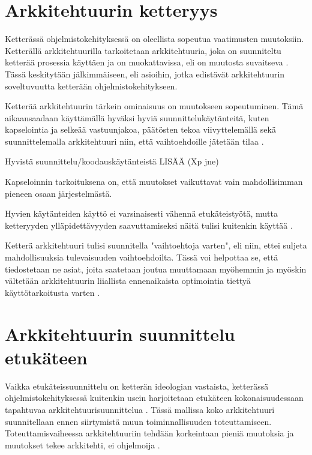 \section{Arkkitehtuurin ketteryys}

Ketterässä ohjelmistokehityksessä on oleellista sopeutua vaatimusten muutoksiin. Ketterällä arkkitehtuurilla tarkoitetaan arkkitehtuuria, joka on suunniteltu ketterää prosessia käyttäen ja on muokattavissa, eli on muutosta suvaitseva \citep{waterman_how_2015}. Tässä keskitytään jälkimmäiseen, eli asioihin, jotka edistävät arkkitehtuurin soveltuvuutta ketterään ohjelmistokehitykseen.

Ketterää arkkitehtuurin tärkein ominaisuus on muutokseen sopeutuminen. Tämä aikaansaadaan käyttämällä hyväksi hyviä suunnittelukäytänteitä, kuten kapselointia ja selkeää vastuunjakoa, päätösten tekoa viivyttelemällä sekä suunnittelemalla arkkitehtuuri niin, että vaihtoehdoille jätetään tilaa \citep{waterman_agility_2018_a}. 

Hyvistä suunnittelu/koodauskäytänteistä LISÄÄ  (Xp jne)

Kapseloinnin tarkoituksena on, että muutokset vaikuttavat vain mahdollisimman pieneen osaan järjestelmästä. 


Hyvien käytänteiden käyttö ei varsinaisesti vähennä etukäteistyötä, mutta ketteryyden ylläpidettävyyden saavuttamiseksi näitä tulisi kuitenkin käyttää \citep{waterman_agility_2018_a}. 

Ketterä arkkitehtuuri tulisi suunnitella "vaihtoehtoja varten", eli niin, ettei suljeta mahdollisuuksia tulevaisuuden vaihtoehdoilta. Tässä voi helpottaa se, että tiedostetaan ne asiat, joita saatetaan joutua muuttamaan myöhemmin ja myöskin vältetään arkkitehtuurin liiallista ennenaikaista optimointia tiettyä käyttötarkoitusta varten 
\citep{waterman_agility_2018_a}.  


\section{Arkkitehtuurin suunnittelu etukäteen}
Vaikka etukäteissuunnittelu on ketterän ideologian vastaista, ketterässä ohjelmistokehityksessä kuitenkin usein harjoitetaan etukäteen kokonaisuudessaan tapahtuvaa arkkitehtuurisuunnittelua \citep{rost_distilling_2015, eloranta2015techniques}. Tässä mallissa koko arkkitehtuuri suunnitellaan ennen siirtymistä muun toiminnallisuuden toteuttamiseen. Toteuttamisvaiheessa arkkitehtuuriin tehdään korkeintaan pieniä muutoksia ja muutokset tekee arkkitehti, ei ohjelmoija \citep{eloranta2015techniques}.

